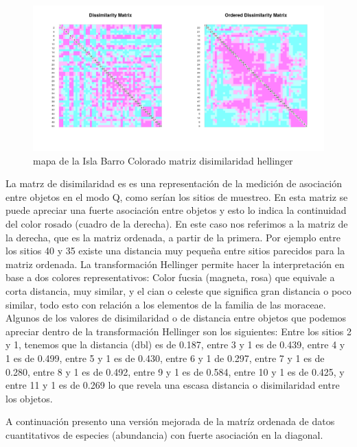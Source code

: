 \documentclass[11pt,]{article}
\begin{document}
\begin{figure}
\centering
\includegraphics[width=1.00000\textwidth]{matriz_disimilaridad_hellinger.png}
\caption{mapa de la Isla Barro Colorado matriz disimilaridad hellinger
\label{fig:bci_map}}
\end{figure}

La matrz de disimilaridad es es una representación de la medición de
asociación entre objetos en el modo Q, como serían los sitios de
muestreo. En esta matriz se puede apreciar una fuerte asociación entre
objetos y esto lo indica la continuidad del color rosado (cuadro de la
derecha). En este caso nos referimos a la matriz de la derecha, que es
la matriz ordenada, a partir de la primera. Por ejemplo entre los sitios
40 y 35 existe una distancia muy pequeña entre sitios parecidos para la
matriz ordenada. La transformación Hellinger permite hacer la
interpretación en base a dos colores representativos: Color fucsia
(magneta, rosa) que equivale a corta distancia, muy similar, y el cian o
celeste que significa gran distancia o poco similar, todo esto con
relación a los elementos de la familia de las moraceae. Algunos de los
valores de disimilaridad o de distancia entre objetos que podemos
apreciar dentro de la transformación Hellinger son los siguientes: Entre
los sitios 2 y 1, tenemos que la distancia (dbl) es de 0.187, entre 3 y
1 es de 0.439, entre 4 y 1 es de 0.499, entre 5 y 1 es de 0.430, entre 6
y 1 de 0.297, entre 7 y 1 es de 0.280, entre 8 y 1 es de 0.492, entre 9
y 1 es de 0.584, entre 10 y 1 es de 0.425, y entre 11 y 1 es de 0.269 lo
que revela una escasa distancia o disimilaridad entre los objetos.

A continuación presento una versión mejorada de la matríz ordenada de
datos cuantitativos de especies (abundancia) con fuerte asociación en la
diagonal.
\end{document}
